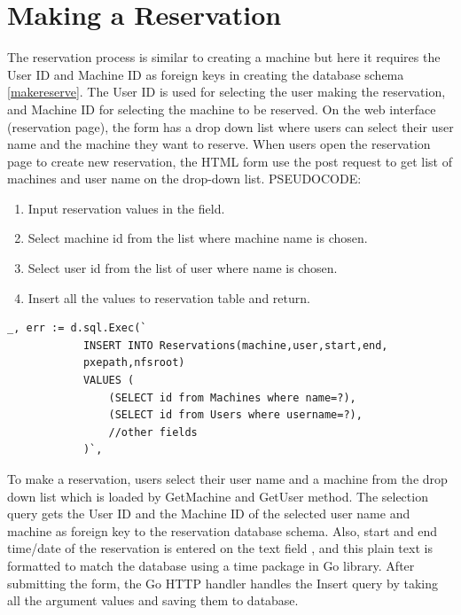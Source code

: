\section*{Making a Reservation}
The reservation process is similar to creating a machine but here it requires the User ID and Machine ID as foreign keys in creating the database schema \ref{makereserve}. The User ID is used for selecting the user making the reservation, and Machine ID for selecting the machine to be reserved. On the web interface (reservation page), the form has a drop down list where users can select their user name and the machine they want to reserve. When users open the reservation page to create new reservation, the HTML form use the post request to get list of machines and user name on the drop-down list.
PSEUDOCODE:
\begin{enumerate}
\item Input reservation values in the field.
\item Select machine id from the list where machine name is chosen.
\item Select user id from the list of user where name is chosen.
\item Insert all the values to reservation table and return.
\end{enumerate}
\begin{lstlisting}[caption=Storing Reservation details, label=Adding reservation]
	_, err := d.sql.Exec(`
			INSERT INTO Reservations(machine,user,start,end,
			pxepath,nfsroot)
			VALUES (
				(SELECT id from Machines where name=?),
				(SELECT id from Users where username=?),
				//other fields
			)`,
\end{lstlisting}

To make a reservation, users select their user name and a machine from the drop down list which is loaded by GetMachine and GetUser method. The selection query gets the User ID and the Machine ID of the selected user name and machine as foreign key to the reservation database schema. Also, start and end time/date of the reservation is entered on the text field , and this plain text is formatted to match the database using a time package in Go library. After submitting the form, the Go HTTP handler handles the Insert query by taking all the argument values and saving them to database. 
